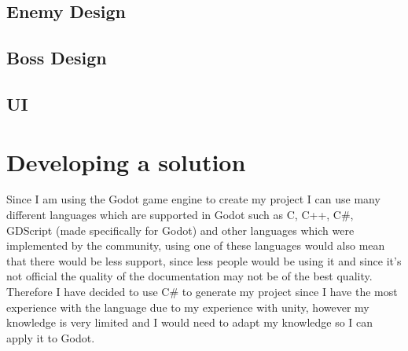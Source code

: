 \documentclass{article}
\begin{document}
\subsection{Enemy Design}

\subsection{Boss Design}

\subsection{UI}

\section{Developing a solution}
Since I am using the Godot game engine to create my project I can use many different languages which are supported in Godot such as C, C++, C\#, GDScript (made specifically for Godot) and other languages which were implemented by the community, using one of these languages would also mean that there would be less support, since less people would be using it and since it's not official the quality of the documentation may not be of the best quality. Therefore I have decided to use C\# to generate my project since I have the most experience with the language due to my experience with unity, however my knowledge is very limited and I would need to adapt my knowledge so I can apply it to Godot. 
\end{document}
